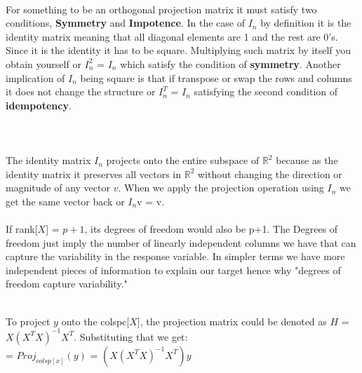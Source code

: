 \documentclass[12pt]{article}
\begin{document}
\begin{enumerate}


 \\
For something to be an orthogonal projection matrix it must satisfy two conditions, \textbf{Symmetry} and \textbf{Impotence}. In the case of \(I_n\) by definition it is the identity matrix meaning that all diagonal elements are 1 and the rest are 0's. Since it is the identity it has to be square. Multiplying such matrix by itself you obtain yourself or \(I_n^{2}\) = \(I_n\) which satisfy the condition of \textbf{symmetry}. Another implication of \(I_n\) being square is that if transpose or swap the rows and columns it does not change the structure or \(I_n^{T}\) = \(I_n\) satisfying the second condition of \textbf{idempotency}. \\ \\ \\


 \\
The identity matrix \(I_n\) projects onto the entire subspace of \( \mathbb{R}^{2} \) because as the identity matrix it preserves all vectors in \( \mathbb{R}^{2} \) without changing the direction or magnitude of any vector \(v\). When we apply the projection operation using \(I_n\) we get the same vector back or \(I_n\)v = v. \\

 \\ 
If rank[\(X\)] = \(p+1\), its degrees of freedom would also be p+1. The Degrees of freedom just imply the number of linearly independent columns we have that can capture the variability in the response variable. In simpler terms we have more independent pieces of information to explain our target hence why "degrees of freedom capture variability."


 \\ 
To project \(y\) onto the colspc[\(X\)], the projection matrix could be denoted as \(H\) = \(X (X^T X)^{-1} X^T\). Substituting that we get: \\
= \(Proj_{colsp[x]} (y)\) =  \((X (X^T X)^{-1} X^T)y \) \\ 


\end{enumerate}
\end{document}

